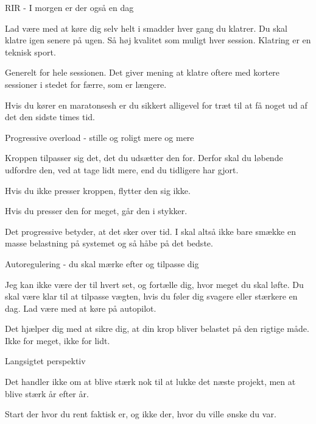 \begin{multicols}{2}
\begin{tList}{RIR - I morgen er der også en dag}
\item Lad være med at køre dig selv helt i smadder hver gang du klatrer. Du skal klatre igen senere på ugen. Så høj kvalitet som muligt hver session. Klatring er en teknisk sport.

\item Generelt for hele sessionen. Det giver mening at klatre oftere med kortere sessioner i stedet for færre, som er længere.

\item Hvis du kører en maratonsesh er du sikkert alligevel for træt til at få noget ud af det den sidste times tid.
\end{tList}

\begin{tList}{Progressive overload - stille og roligt mere og mere}

\item Kroppen tilpasser sig det, det du udsætter den for. Derfor skal du løbende udfordre den, ved at tage lidt mere, end du tidligere har gjort.

\item Hvis du ikke presser kroppen, flytter den sig ikke.
\item Hvis du presser den for meget, går den i stykker.

\item Det progressive betyder, at det sker over tid. I skal altså ikke bare smække en masse belastning på systemet og så håbe på det bedste.
\end{tList}

\begin{tList}{Autoregulering - du skal mærke efter og tilpasse dig}

\item Jeg kan ikke være der til hvert set, og fortælle dig, hvor meget du skal løfte. Du skal være klar til at tilpasse vægten, hvis du føler dig svagere eller stærkere en dag. Lad være med at køre på autopilot.

\item Det hjælper dig med at sikre dig, at din krop bliver belastet på den rigtige måde. Ikke for meget, ikke for lidt.
\end{tList}

\begin{tList}{Langsigtet perspektiv}

\item Det handler ikke om at blive stærk nok til at lukke det næste projekt, men at blive stærk år efter år.
\item Start der hvor du rent faktisk er, og ikke der, hvor du ville ønske du var.


\end{tList}
\end{multicols}
